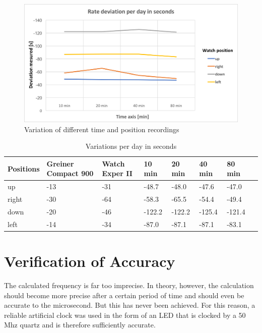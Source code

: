 \documentclass[12pt, a4paper]{report}
\begin{document}
    \noindent
    \begin{figure}[H]
        \includegraphics[scale=0.62]{Images/variations_per_day.png}
    
    \caption{ Variation of different time and position recordings}
    \end{figure}    
    
    \begin{table}[H]
      \centering
        \begin{tabularx}{\linewidth}{ |L|L|L|L|L|L|L|L|  }
        \hline
        {\fontsize{10}{12}\selectfont \textbf{Positions}} &{\fontsize{9}{10}\selectfont \textbf{Greiner Compact 900}} & {\fontsize{10}{12}\selectfont \textbf{Watch Exper II}} & {\fontsize{10}{12}\selectfont \textbf{10 min}} &  {\fontsize{10}{12}\selectfont \textbf{20 min}} &  {\fontsize{10}{12}\selectfont \textbf{40 min}} & {\fontsize{10}{12}\selectfont  \textbf{80 min}} \\ \hline
        up        & -13                 &      -31  & -48.7     & -48.0     & -47.6      & -47.0      \\ \hline
        right     & -30                 &      -64  & -58.3      & -65.5    & -54.4      & -49.4      \\ \hline
        down      & -20               &  -46  & -122.2    & -122.2     & -125.4    & -121.4      \\ \hline
        left      & -14                & -34 & -87.0	   & -87.1	  & -87.1	  & -83.1      \\ \hline
        \end{tabularx}
          \caption{ Variations per day in seconds} 
    \end{table}
    
    \section{Verification of Accuracy}
    The calculated frequency is far too imprecise. In theory, however, the calculation should become more precise after a certain period of time and should even be accurate to the microsecond.
    But this has never been achieved. For this reason, a reliable artificial clock was used in the form of an LED that is clocked by a 50 Mhz quartz and is therefore sufficiently accurate.
    
\end{document}
